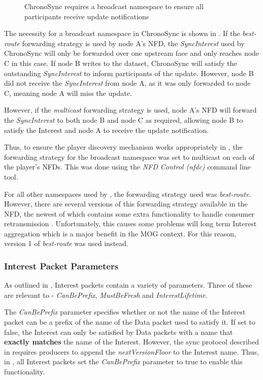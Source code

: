 \begin{figure}[H]
    \centering
    \caption{ChronoSync requires a broadcast namespace to ensure all participants receive update notifications}
    \label{fig:impl:disc-fs}
\end{figure}

The necessity for a broadcast namespace in ChronoSync is shown in . If the \textit{best-route} forwarding strategy is used by node A's NFD, the \textit{SyncInterest} used by ChronoSync will only be forwarded over one upstream face and only reaches node C in this case. If node B writes to the dataset, ChronoSync will satisfy the outstanding \textit{SyncInterest} to inform participants of the update. However, node B did not receive the \textit{SyncInterest} from node A, as it was only forwarded to node C, meaning node A will miss the update.

However, if the \textit{multicast} forwarding strategy is used, node A's NFD will forward the \textit{SyncInterest} to both node B and node C as required, allowing node B to satisfy the Interest and node A to receive the update notification. 

Thus, to ensure the player discovery mechanism works appropriately in \game{}, the forwarding strategy for the broadcast namespace was set to multicast on each of the player's NFDs. This was done using the \textit{NFD Control (nfdc)} \cite{nfdc} command line tool.

For all other namespaces used by \game{}, the forwarding strategy used was \textit{best-route}. However, there are several versions of this forwarding strategy available in the NFD, the newest of which contains some extra functionality to handle consumer retransmission \cite{nfd-bestroute-v2}. Unfortunately, this causes some problems will long term Interest aggregation which is a major benefit in the MOG context. For this reason, version 1 of \textit{best-route} was used instead.

\subsubsection{Interest Packet Parameters}
As outlined in , Interest packets contain a variety of parameters. Three of these are relevant to \game{} - \textit{CanBePrefix}, \textit{MustBeFresh} and \textit{InterestLifetime}.

The \textit{CanBePrefix} parameter specifies whether or not the name of the Interest packet can be a prefix of the name of the Data packet used to satisfy it. If set to false, the Interest can only be satisfied by Data packets with a name that \textbf{exactly matches} the name of the Interest. However, the sync protocol described in  requires producers to append the \textit{nextVersionFloor} to the Interest name. Thus, in \game{}, all Interest packets set the \textit{CanBePrefix} parameter to true to enable this functionality.

